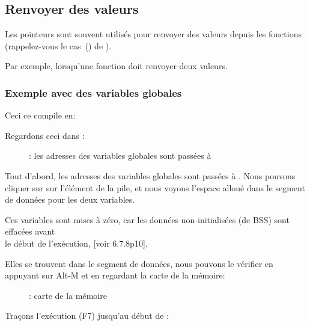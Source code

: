 \subsection{Renvoyer des valeurs}

Les pointeurs sont souvent utilisés pour renvoyer des valeurs depuis les fonctions
(rappelez-vous le cas~() de \scanf).

Par exemple, lorsqu'une fonction doit renvoyer deux valeurs.

\subsubsection{Exemple avec des variables globales}



Ceci ce compile en:



\myindex{\olly}
\clearpage
Regardons ceci dans \olly:

\begin{figure}[H]
\centering
{}
\caption{\olly: 
les adresses des variables globales sont passées à \ttfone}
\label{fig:pointers_olly_global_1}
\end{figure}

Tout d'abord, les adresses des variables globales sont passées à \ttfone.
Nous pouvons cliquer sur 
sur l'élément de la pile, et nous voyons l'espace alloué dans le segment de données
pour les deux variables.

\clearpage
Ces variables sont mises à zéro, car les données non-initialisées (de
\ac{BSS}) sont effacées avant\\
le début de l'exécution, [voir \CNineNineStd{} 6.7.8p10].

Elles se trouvent dans le segment de données, nous pouvons le vérifier en appuyant
sur Alt-M et en regardant la carte de la mémoire:

\begin{figure}[H]
\centering
{}
\caption{\olly: carte de la mémoire}
\label{fig:pointers_olly_global_5}
\end{figure}

\clearpage
Traçons l'exécution (F7) jusqu'au début de \ttfone:

